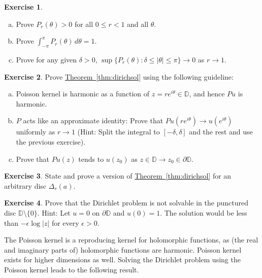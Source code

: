 \documentclass[12pt,openany]{book}
\newcommand{\sabs}[1]{\lvert {#1} \rvert}
\newcommand{\abs}[1]{\left\lvert {#1} \right\rvert}
\newcommand{\D}{{\mathbb{D}}}
\theoremstyle{plain}
\theoremstyle{remark}
\theoremstyle{definition}
\newenvironment{exbox}{%
    \def\FrameCommand{\vrule width 1pt \relax\hspace{10pt}}%
    \MakeFramed{\advance\hsize-\width\FrameRestore}%
}{%
    \endMakeFramed
}
\newenvironment{exparts}{%
    \leavevmode\begin{enumerate}[a),noitemsep,topsep=0pt,parsep=0pt,partopsep=0pt]
}{%
    \end{enumerate}
}
\theoremstyle{exercise}
\newtheorem{exercise}{Exercise}[section]
\theoremstyle{example}
\newcommand{\thmref}[1]{\hyperref[#1]{Theorem~\ref*{#1}}}
\begin{document}
\begin{exbox}
\begin{exercise}
\begin{exparts}
\item
Prove $P_r(\theta) > 0$ for all $0 \leq r < 1$ and all $\theta$.
\item
Prove $\int_{-\pi}^{\pi} P_r(\theta) \, d\theta = 1$.
\item
Prove for any given $\delta > 0$,
$\sup \{P_r(\theta) : \delta \leq \abs{\theta} \leq \pi \} \to 0$ as
$r \to 1$.
\end{exparts}
\end{exercise}

\begin{exercise}
\pagebreak[1]%
Prove \thmref{thm:dirichsol} using the following guideline:
\begin{exparts}
\item
Poisson kernel is harmonic
as a function of $z=re^{i\theta} \in \D$, and hence
$Pu$ is harmonic.
\item
$P$ acts like an
approximate identity: Prove that
$Pu(re^{i\theta}) \to u(e^{i\theta})$ uniformly as
$r \to 1$ (Hint: Split the integral to $[-\delta,\delta]$ and the rest
and use the previous exercise).
\item
Prove that $Pu(z)$ tends to $u(z_0)$ as
$z \in \D \to z_0 \in \partial \D$.
\end{exparts}
\end{exercise}

\begin{exercise}
\pagebreak[2]%
State and prove a version of \thmref{thm:dirichsol} for an arbitrary disc
$\Delta_r(a)$.
\end{exercise}

\begin{exercise}
Prove that the Dirichlet problem is not solvable in the punctured disc $\D
\setminus \{ 0 \}$.
Hint: Let $u = 0$ on $\partial \D$ and $u(0)=1$.
The solution would be
less than $- \epsilon \log \sabs{z}$ for every $\epsilon > 0$.
\end{exercise}
\end{exbox}

The Poisson kernel is a reproducing kernel for
holomorphic functions, as (the real and imaginary parts of) holomorphic functions are harmonic.
Poisson kernel exists for higher dimensions as well.
Solving the Dirichlet problem using the Poisson kernel leads to
the following result.
\end{document}
